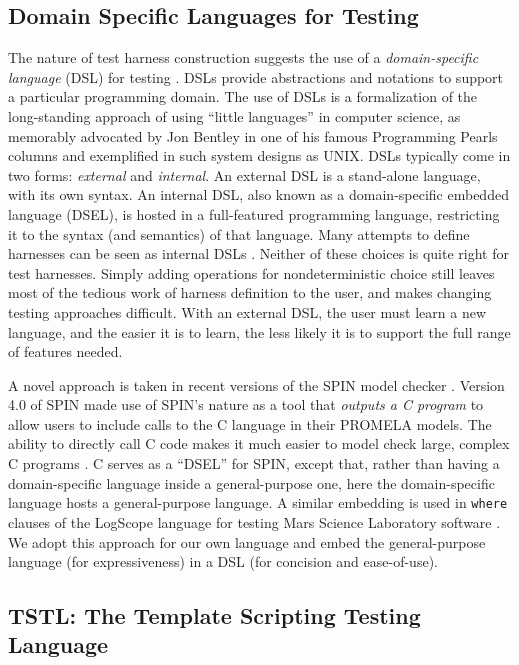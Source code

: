\subsection{Domain Specific Languages for Testing}

The nature of test harness construction suggests the use of a
\emph{domain-specific language} (DSL) for testing \cite{ISOLA12}.  DSLs
\cite{Fow10} provide abstractions and notations to support a
particular programming domain. The use of DSLs is a formalization of
the long-standing approach of using ``little languages'' in computer
science, as memorably advocated by Jon Bentley in one of his famous
Programming Pearls columns \cite{LitLang} and exemplified in such system
designs as UNIX.  DSLs typically come in two forms: \emph{external}
and \emph{internal}.  An external DSL is a stand-alone language, with
its own syntax.  An internal DSL, also known as a domain-specific
embedded language (DSEL), is hosted in a full-featured programming
language, restricting it to the syntax (and semantics) of that
language.  Many attempts to define harnesses can be seen as internal
DSLs \cite{UDITA,ISSRE12,JPF2,CBMCp,KLEE}.  Neither of these choices
is quite right for test harnesses.  Simply adding operations for
nondeterministic choice still leaves most of
the tedious work of harness definition to the user, and makes changing
testing approaches difficult.  With an external DSL, the user
must learn a new language, and the easier it is to learn, the less
likely it is to support the full range of features needed.

A novel approach is taken in recent versions of the SPIN model checker
\cite{SPIN}.  Version 4.0 of SPIN \cite{ModelDriven} made use of
SPIN's nature as a tool that \emph{outputs a C program} to allow users
to include calls to the C language in their PROMELA models.  The
ability to directly call C code makes it much easier to model check
large, complex C programs \cite{AMAI,ModelCode}.  C serves as a
``DSEL'' for SPIN, except that, rather than having a domain-specific
language inside a general-purpose one, here the domain-specific
language hosts a general-purpose language.  A similar embedding is
used in {\tt where} clauses of the LogScope language for testing Mars
Science Laboratory software \cite{scriptstospecs}.  We adopt this
approach for our own language and embed the general-purpose language (for expressiveness) in a
DSL (for concision and ease-of-use).

\subsection{TSTL: The Template Scripting Testing Language}

